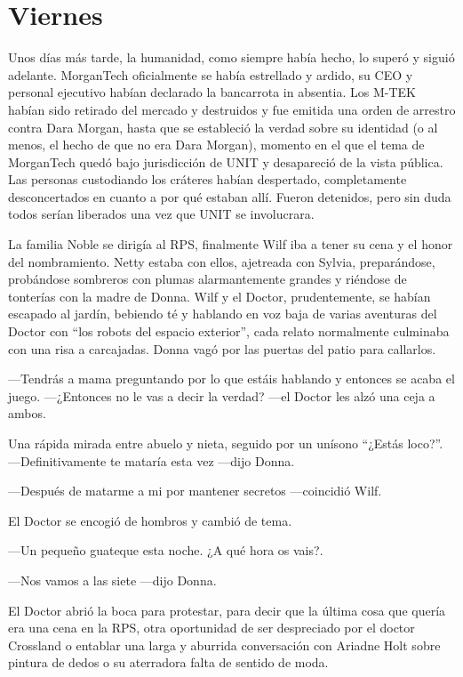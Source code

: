 \chapter*{Viernes}

Unos días más tarde, la humanidad, como siempre había hecho, lo superó y
siguió adelante. MorganTech oficialmente se había estrellado y ardido,
su CEO y personal ejecutivo habían declarado la bancarrota in absentia.
Los M-TEK habían sido retirado del mercado y destruidos y fue emitida
una orden de arrestro contra Dara Morgan, hasta que se estableció la
verdad sobre su identidad (o al menos, el hecho de que no era Dara
Morgan), momento en el que el tema de MorganTech quedó bajo jurisdicción
de UNIT y desapareció de la vista pública. Las personas custodiando los
cráteres habían despertado, completamente desconcertados en cuanto a por
qué estaban allí. Fueron detenidos, pero sin duda todos serían liberados
una vez que UNIT se involucrara.

La familia Noble se dirigía al RPS, finalmente Wilf iba a tener su cena
y el honor del nombramiento. Netty estaba con ellos, ajetreada con
Sylvia, preparándose, probándose sombreros con plumas alarmantemente
grandes y riéndose de tonterías con la madre de Donna. Wilf y el Doctor,
prudentemente, se habían escapado al jardín, bebiendo té y hablando en
voz baja de varias aventuras del Doctor con ``los robots del espacio
exterior'', cada relato normalmente culminaba con una risa a carcajadas.
Donna vagó por las puertas del patio para callarlos.

---Tendrás a mama preguntando por lo que estáis hablando y entonces se
acaba el juego. ---¿Entonces no le vas a decir la verdad? ---el Doctor
les alzó una ceja a ambos.

Una rápida mirada entre abuelo y nieta, seguido por un unísono ``¿Estás
loco?''. ---Definitivamente te mataría esta vez ---dijo Donna.

---Después de matarme a mi por mantener secretos ---coincidió Wilf.

El Doctor se encogió de hombros y cambió de tema.

---Un pequeño guateque esta noche. ¿A qué hora os vais?.

---Nos vamos a las siete ---dijo Donna.

El Doctor abrió la boca para protestar, para decir que la última cosa
que quería era una cena en la RPS, otra oportunidad de ser despreciado
por el doctor Crossland o entablar una larga y aburrida conversación con
Ariadne Holt sobre pintura de dedos o su aterradora falta de sentido de
moda.


